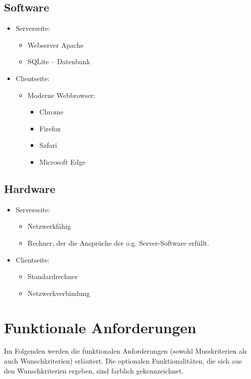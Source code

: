 \documentclass[parskip=full,11pt]{scrartcl}
\begin{document}
\subsection{Software}
\begin{itemize}[itemsep=0pt]
\item Serverseite:
	\begin{itemize}
	\item Webserver Apache 
	\item SQLite – Datenbank
	\end{itemize}
\item Clientseite:
	\begin{itemize}
	\item Moderne Webbrowser:
		\begin{itemize}
		\item Chrome
		\item Firefox
		\item Safari
		\item Microsoft Edge
		\end{itemize}
	
	\end{itemize}
\end{itemize}
\newpage
\subsection{Hardware}
\begin{itemize}[itemsep=0pt]

	\item Serverseite:
	\begin{itemize}
	\item Netzwerkfähig
	\item Rechner, der die Ansprüche der o.g. Server-Software erfüllt.
	\end{itemize}
	\item Clientseite:
	\begin{itemize}
	\item Standardrechner
	\item Netzwerkverbindung
	\end{itemize}
\end{itemize}
\section{Funktionale Anforderungen}
Im Folgenden werden die funktionalen Anforderungen (sowohl Musskriterien als auch Wunschkriterien) erläutert. Die optionalen Funktionalitäten, die sich aus den Wunschkriterien ergeben, sind \colorbox{shadecolor}{farblich gekennzeichnet}.
\end{document}
